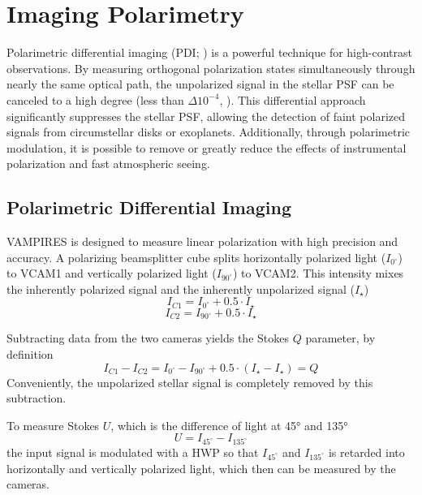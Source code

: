 \section{Imaging Polarimetry}\label{sec:polarimetry}

Polarimetric differential imaging (PDI; \citealp{kuhn_imaging_2001}) is a powerful technique for high-contrast observations. By measuring orthogonal polarization states simultaneously through nearly the same optical path, the unpolarized signal in the stellar PSF can be canceled to a high degree (less than $\Delta10^{-4}$, \citealp{schmid_spherezimpol_2018}). This differential approach significantly suppresses the stellar PSF, allowing the detection of faint polarized signals from circumstellar disks or exoplanets. Additionally, through polarimetric modulation, it is possible to remove or greatly reduce the effects of instrumental polarization and fast atmospheric seeing.
 
\subsection{Polarimetric Differential Imaging}

VAMPIRES is designed to measure linear polarization with high precision and accuracy. A polarizing beamsplitter cube splits horizontally polarized light ($I_{0^\circ}$) to VCAM1 and vertically polarized light ($I_{90^\circ}$) to VCAM2. This intensity mixes the inherently polarized signal and the inherently unpolarized signal ($I_\star$)
\begin{equation}
    I_{C1} = I_{0^\circ} + 0.5\cdot I_\star
\end{equation}
\begin{equation}
    I_{C2} = I_{90^\circ} + 0.5\cdot I_\star
\end{equation}

Subtracting data from the two cameras yields the Stokes $Q$ parameter, by definition
\begin{equation}
    I_{C1} - I_{C2} = I_{0^\circ} - I_{90^\circ} + 0.5\cdot \left( I_\star - I_\star\right) = Q
\end{equation}
Conveniently, the unpolarized stellar signal is completely removed by this subtraction.

To measure Stokes $U$, which is the difference of light at \ang{45} and \ang{135}
\begin{equation}
    U = I_{45^\circ} - I_{135^\circ}
\end{equation}
the input signal is modulated with a HWP so that $I_{45^\circ}$ and $I_{135^\circ}$ is retarded into horizontally and vertically polarized light, which then can be measured by the cameras.


